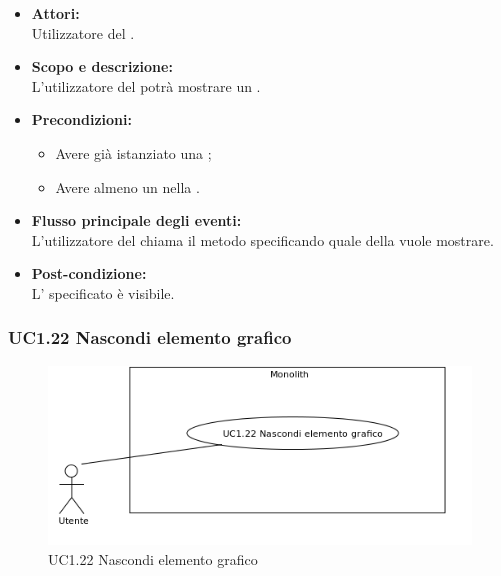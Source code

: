 \begin{itemize}
	\item \textbf{Attori:}
	\\Utilizzatore del .
	\item \textbf{Scopo e descrizione:} 
	\\L'utilizzatore del  potrà mostrare un .
	\item \textbf{Precondizioni:}
	\begin{itemize}
		\item Avere già istanziato una ;
		\item Avere almeno un  nella .
	\end{itemize}
	\item \textbf{Flusso principale degli eventi:}
	\\L'utilizzatore del  chiama il metodo specificando quale  della  vuole mostrare.
	\item \textbf{Post-condizione:}
	\\L' specificato è visibile.
\end{itemize}

\subsubsection{UC1.22 Nascondi elemento grafico} \label{UC1.22}

\begin{figure}[H]
	\centering
	\includegraphics[width=15cm]{../../documenti/AnalisiDeiRequisiti/Diagrammi_img/uc1_22.png}
	\caption{UC1.22 Nascondi elemento grafico}
\end{figure}

